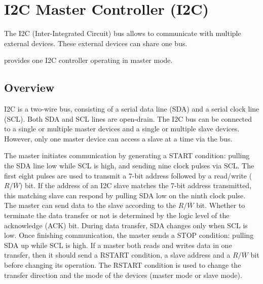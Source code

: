 \documentclass[main\_\_EN.tex]{subfiles}
\begin{document}

\ifglobal
\else
    {\let\clearpage\relax \listoftodos}
    {\let\clearpage\relax \listofdonetodos}
    \tableofcontents
\fi



\hypertarget{i2c}{}
\chapter{I2C Master Controller (I2C)}
\label{mod:i2c}


The I2C (Inter-Integrated Circuit) bus allows \chipname{} to communicate with multiple external devices. These external devices can share one bus.

\chipname{} provides one I2C controller operating in master mode.


\section{Overview}
I2C is a two-wire bus, consisting of a serial data line (SDA) and a serial clock line (SCL). Both SDA and SCL lines are open-drain. The I2C bus can be connected to a single or multiple master devices and a single or multiple slave devices. However, only one master device can access a slave at a time via the bus.

The master initiates communication by generating a START condition: pulling the SDA line low while SCL is high, and sending nine clock pulses via SCL. The first eight pulses are used to transmit a 7-bit address followed by a read/write ($R/\overline W$) bit. If the address of an I2C slave matches the 7-bit address transmitted, this matching slave can respond by pulling SDA low on the ninth clock pulse. The master can send data to the slave according to the $R/\overline W$ bit. Whether to terminate the data transfer or not is determined by the logic level of the acknowledge (ACK) bit. During data transfer, SDA changes only when SCL is low. Once finishing communication, the master sends a STOP condition: pulling SDA up while SCL is high. If a master both reads and writes data in one transfer, then it should send a RSTART condition, a slave address and a $R/\overline W$ bit before changing its operation. The RSTART condition is used to change the transfer direction and the mode of the devices (master mode or slave mode).
\end{document}
